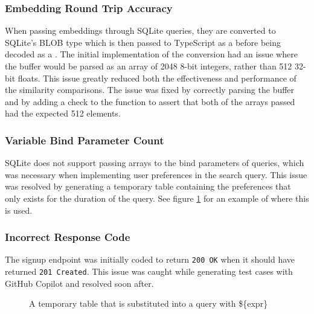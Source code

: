 \subsubsection{Embedding Round Trip Accuracy}\label{sec:embedding_round_trip}
When passing embeddings through SQLite queries, they are converted to SQLite's BLOB type which is then passed to TypeScript as a 
before being decoded as a .
The initial implementation of the conversion had an issue where the buffer would be parsed as an array of 2048 8-bit integers,
rather than 512 32-bit floats. This issue greatly reduced both the effectiveness and performance of the similarity comparisons.
The issue was fixed by correctly parsing the buffer and by adding a check to the  function to assert
that both of the arrays passed had the expected 512 elements.

\subsubsection{Variable Bind Parameter Count}
SQLite does not support passing arrays to the bind parameters of queries, which was
necessary when implementing user preferences in the search query. This issue
was resolved by generating a temporary table containing the preferences
that only exists for the duration of the query. See figure \ref{fig:temp_table_substitution}
for an example of where this is used.

\subsubsection{Incorrect Response Code}
The signup endpoint was initially coded to return \texttt{200 OK} when it should have returned
\texttt{201 Created}. This issue was caught while generating test cases with GitHub Copilot and resolved
soon after.

\begin{figure}[h]
    \caption{\label{fig:temp_table_substitution}A temporary table that is substituted into a query with \$\{expr\}}
    \raggedright

\end{figure}
